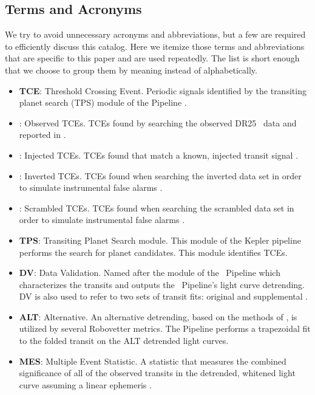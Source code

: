 \subsection{Terms and Acronyms}
\label{abbrev}
We try to avoid unnecessary acronyms and abbreviations, but a few are required to efficiently discuss this catalog.  Here we itemize those terms and abbreviations that are specific to this paper and are used repeatedly. The list is short enough that we choose to group them by meaning instead of alphabetically. 

\begin{itemize}

\item[] \textbf{TCE}: Threshold Crossing Event. Periodic signals identified by the transiting planet search (TPS) module of the \Kepler{} Pipeline \citep{JenkinsKDPH}.
\item[] \textbf{\opstce}: Observed TCEs. TCEs found by searching the observed DR25 \Kepler\ data and reported in \citet{Twicken2016}.
\item[] \textbf{\injtce}: Injected TCEs. TCEs found that match a known, injected transit signal \citep{Christiansen2017}.
\item[] \textbf{\invtce}: Inverted TCEs. TCEs found when searching the inverted data set in order to simulate instrumental false alarms \citep{Coughlin2017a}.
\item[] \textbf{\scrtce}: Scrambled TCEs. TCEs found when searching the scrambled data set in order to simulate instrumental false alarms \citep{Coughlin2017a}.
\item[] \textbf{TPS}: Transiting Planet Search module. This module of the Kepler pipeline performs the search for planet candidates. This module identifies TCEs.
\item[] \textbf{DV}: Data Validation. Named after the module of the \Kepler\ Pipeline which characterizes the transits and outputs the \Kepler\ Pipeline's light curve detrending. DV is also used to refer to two sets of transit fits: original and supplemental \citep{JenkinsKDPH}.
\item[] \textbf{ALT}: Alternative. An alternative detrending, based on the methods of \citet{Garcia2010}, is utilized by several Robovetter metrics. The \Kepler{} Pipeline performs a trapezoidal fit to the folded transit on the ALT detrended light curves.
\item[] \textbf{MES}: Multiple Event Statistic. A statistic that measures the combined significance of all of the observed transits in the detrended, whitened light curve assuming a linear ephemeris \citep[][]{Jenkins2002b}.

\end{itemize}
